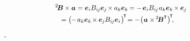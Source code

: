 \nopagebreak\vspace{-0.3em}
\begin{multline}\label{commutativity.thecrossproductofbivalentandvector}
\somebivalenttensor \hspace{-0.1ex} \times \bm{a}
= \bm{e}_i \somebivalenttensorcomponents{i\hspace{-0.1ex}j} \bm{e}_{\hspace{-0.1ex}j} \hspace{-0.25ex} \times \hspace{-0.1ex} a_k \bm{e}_k \hspace{-0.2ex}
= - \hspace{.25ex} \bm{e}_i \somebivalenttensorcomponents{i\hspace{-0.1ex}j} \hspace{.2ex} a_k \bm{e}_k \hspace{-0.25ex} \times \hspace{-0.1ex} \bm{e}_{\hspace{-0.1ex}j}
\\[-0.1em]
= \bigl( \hspace{-0.1ex} - \hspace{.25ex} a_k \bm{e}_k \hspace{-0.25ex} \times \hspace{-0.1ex} \bm{e}_{\hspace{-0.1ex}j} \somebivalenttensorcomponents{i\hspace{-0.1ex}j} \bm{e}_i \hspace{.16ex} \bigr)^{\hspace{-0.25ex}\T} \hspace{-0.4ex}
= - \hspace{.1ex} \bigl( \hspace{.12ex} \bm{a} \times \hspace{-0.2ex} \somebivalenttensortransposed \hspace{.1ex} \bigr)^{\hspace{-0.25ex}\T}
\hspace{-0.4ex} ,
\hspace{1em}
\end{multline}

\noindent
{}
~\en{,}
\hbox{\hspace{-0.2ex}\inquotes{${\hspace{-0.25ex}\times\hspace{-0.1ex}}$}\hspace{-0.2ex}-}

